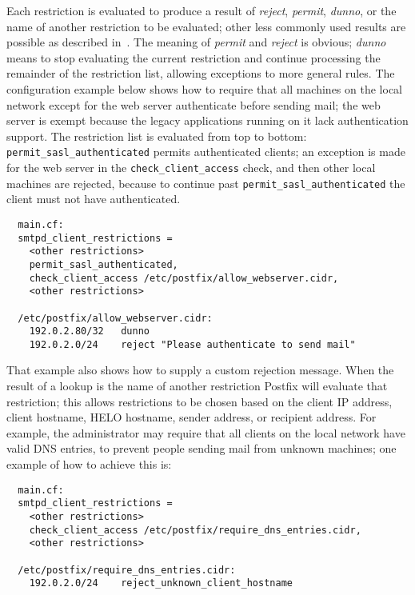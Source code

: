 Each restriction is evaluated to produce a result of \textit{reject},
\textit{permit}, \textit{dunno}, or the name of another restriction to be
evaluated; other less commonly used results are possible as described
in~\cite{access-man-page}.  The meaning of \textit{permit\/} and
\textit{reject\/} is obvious; \textit{dunno\/} means to stop evaluating the
current restriction and continue processing the remainder of the
restriction list, allowing exceptions to more general rules.  The
configuration example below shows how to require that all machines on the
local network except for the web server authenticate before sending mail;
the web server is exempt because the legacy applications running on it lack
authentication support.  The restriction list is evaluated from top to
bottom: \texttt{permit\_sasl\_authenticated} permits authenticated clients;
an exception is made for the web server in the
\texttt{check\_client\_access} check, and then other local machines are
rejected, because to continue past \texttt{permit\_sasl\_authenticated} the
client must not have authenticated.

\begin{verbatim}
  main.cf:
  smtpd_client_restrictions =
    <other restrictions>
    permit_sasl_authenticated,
    check_client_access /etc/postfix/allow_webserver.cidr,
    <other restrictions>

  /etc/postfix/allow_webserver.cidr:
    192.0.2.80/32   dunno
    192.0.2.0/24    reject "Please authenticate to send mail"
\end{verbatim}

That example also shows how to supply a custom rejection message.  When the
result of a lookup is the name of another restriction Postfix will evaluate
that restriction; this allows restrictions to be chosen based on the client
IP address, client hostname, HELO hostname, sender address, or recipient
address.  For example, the administrator may require that all clients on
the local network have valid DNS entries, to prevent people sending mail
from unknown machines; one example of how to achieve this is:

\begin{verbatim}
  main.cf:
  smtpd_client_restrictions =
    <other restrictions>
    check_client_access /etc/postfix/require_dns_entries.cidr,
    <other restrictions>

  /etc/postfix/require_dns_entries.cidr:
    192.0.2.0/24    reject_unknown_client_hostname
\end{verbatim}

